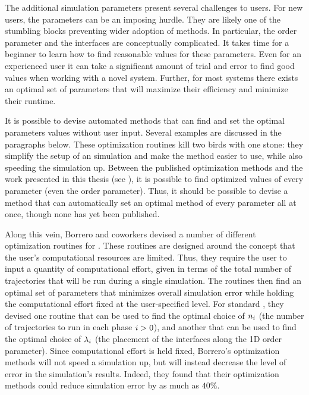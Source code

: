 The additional simulation parameters present several challenges to users. For new users, the  parameters can be an imposing hurdle. They are likely one of the stumbling blocks preventing wider adoption of  methods. In particular, the order parameter and the interfaces are conceptually complicated. It takes time for a beginner to learn how to find reasonable values for these parameters. Even for an experienced user it can take a significant amount of trial and error\cite{Kratzer:2013fs} to find good values when working with a novel system. Further, for most systems there exists an optimal\cite{Ma:2005jh} set of  parameters that will maximize their efficiency and minimize their runtime.

It is possible to devise automated methods that can find and set the optimal  parameters values without user input. Several examples are discussed in the paragraphs below. These optimization routines kill two birds with one stone: they simplify the setup of an  simulation and make the method easier to use, while also speeding the simulation up. Between the published optimization methods and the work presented in this thesis (see ), it is possible to find optimized values of every  parameter (even the order parameter\cite{Borrero:2007eq}). Thus, it should be possible to devise a method that can automatically set an optimal method of every parameter all at once, though none has yet been published.%

Along this vein, Borrero and coworkers devised a number of different optimization routines\cite{Borrero:2008il} for . These routines are designed around the concept that the user's computational resources are limited. Thus, they require the user to input a quantity of computational effort, given in terms of the total number of trajectories that will be run during a single  simulation. The routines then find an optimal set of parameters that minimizes overall simulation error while holding the computational effort fixed at the user-specified level. For standard , they devised one routine that can be used to find the optimal choice of $n_{i}$ (the number of trajectories to run in each phase $i>0$), and another that can be used to find the optimal choice of ${\lambda}_{i}$ (the placement of the interfaces along the 1D order parameter). Since computational effort is held fixed, Borrero's optimization methods will not speed a simulation up, but will instead decrease the level of error in the simulation's results. Indeed, they found that their optimization methods could reduce simulation error by as much as $40\%$.

